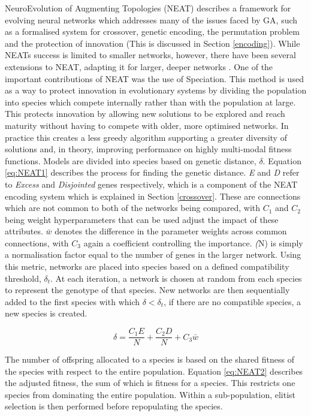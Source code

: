 		NeuroEvolution of Augmenting Topologies (NEAT) \cite{24} describes a framework for evolving neural networks which addresses many of the issues faced by GA, such as a formalised system for crossover, genetic encoding, the permutation problem and the protection of innovation (This is discussed in Section \ref{encoding}). While NEATs success is limited to smaller networks, however, there have been several extensions to NEAT, adapting it for larger, deeper networks \cite{44}\cite{25}.
		One of the important contributions of NEAT was the use of Speciation. This method is used as a way to protect innovation in evolutionary systems by dividing the population into species which compete internally rather than with the population at large. This protects innovation by allowing new solutions to be explored and reach maturity without having to compete with older, more optimised networks. In practice this creates a less greedy algorithm supporting a greater diversity of solutions and, in theory, improving performance on highly multi-modal fitness functions. 
		Models are divided into species based on genetic distance, \(\delta\). Equation \ref{eq:NEAT1} describes the process for finding the genetic distance. \textit{E} and \textit{D} refer to \textit{Excess} and \textit{Disjointed} genes respectively, which is a component of the NEAT encoding system which is explained in Section \ref{crossover}. These are connections which are not common to both of the networks being compared, with \(C_1\) and \(C_2\) being weight hyperparameters that can be used adjust the impact of these attributes. \(\bar{w}\) denotes the difference in the parameter weights across common connections, with \(C_3\) again a coefficient controlling the importance. \textit(N) is simply a normalisation factor equal to the number of genes in the larger network. Using this metric, networks are placed into species based on a defined compatibility threshold, \(\delta_t\). At each iteration, a network is chosen at random from each species to represent the genotype of that species. New networks are then sequentially added to the first species with which \(\delta < \delta_t\), if there are no compatible species, a new species is created.

		\begin{equation}\label{eq:NEAT1}	\delta = \frac{C_1E}{N}+\frac{C_2D}{N}+C_3\bar{w}
		\end{equation}


		The number of offspring allocated to a species is based on the shared fitness of the species with respect to the entire population. Equation \ref{eq:NEAT2} describes the adjusted fitness, the sum of which is fitness for a species. This restricts one species from dominating the entire population. Within a sub-population, elitist selection is then performed before repopulating the species. 

